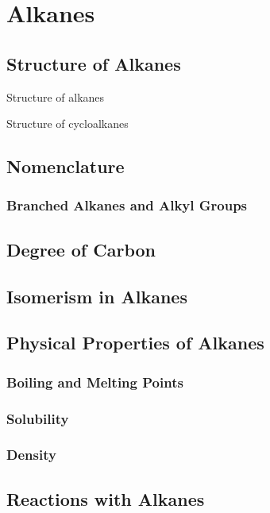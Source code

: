\documentclass[../main]{subfiles}
\begin{document}
\section{Alkanes}

	\subsection{Structure of Alkanes}

	Structure of alkanes

	Structure of cycloalkanes

	\subsection{Nomenclature}

	\subsubsection{Branched Alkanes and Alkyl Groups}

	\subsection{Degree of Carbon}

	\subsection{Isomerism in Alkanes}

	\subsection{Physical Properties of Alkanes}

	\subsubsection{Boiling and Melting Points}

	\subsubsection{Solubility}

	\subsubsection{Density}

	\subsection{Reactions with Alkanes}
\end{document}
